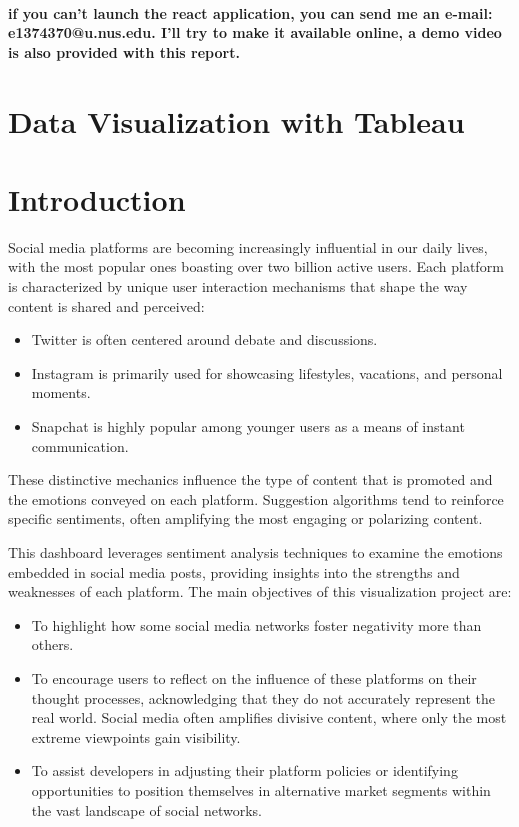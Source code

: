 \documentclass[a4paper,12pt,titlepage,leqno]{article}
\begin{document}
\newpage
\tableofcontents
~

\newpage

{\color{red}\textbf{if you can't launch the react application, you can send me an e-mail: e1374370@u.nus.edu. I'll try to make it available online, a demo video is also provided with this report.}}

\section{Data Visualization with Tableau}

\section{Introduction}

Social media platforms are becoming increasingly influential in our daily lives, with the most popular ones boasting over two billion active users. Each platform is characterized by unique user interaction mechanisms that shape the way content is shared and perceived:

\begin{itemize}
    \item Twitter is often centered around debate and discussions.
    \item Instagram is primarily used for showcasing lifestyles, vacations, and personal moments.
    \item Snapchat is highly popular among younger users as a means of instant communication.
\end{itemize}

These distinctive mechanics influence the type of content that is promoted and the emotions conveyed on each platform. Suggestion algorithms tend to reinforce specific sentiments, often amplifying the most engaging or polarizing content.

This dashboard leverages sentiment analysis techniques to examine the emotions embedded in social media posts, providing insights into the strengths and weaknesses of each platform. The main objectives of this visualization project are:

\begin{itemize}
    \item To highlight how some social media networks foster negativity more than others.
    \item To encourage users to reflect on the influence of these platforms on their thought processes, acknowledging that they do not accurately represent the real world. Social media often amplifies divisive content, where only the most extreme viewpoints gain visibility.
    \item To assist developers in adjusting their platform policies or identifying opportunities to position themselves in alternative market segments within the vast landscape of social networks.
\end{itemize}
\end{document}
